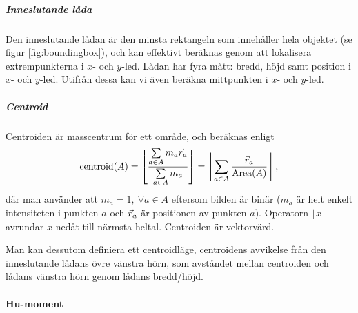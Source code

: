 \documentclass[../rapport_MVEX01-11-05]{subfiles}
\begin{document}
\subparagraph{Inneslutande låda}

Den inneslutande lådan är den minsta rektangeln som innehåller hela
objektet (se figur \ref{fig:boundingbox}),
och kan effektivt beräknas genom att lokalisera
extrempunkterna i $x$- och $y$-led. Lådan har fyra mått: bredd, höjd samt
position i $x$- och $y$-led. Utifrån dessa kan vi även beräkna
mittpunkten i $x$- och $y$-led.

\subparagraph{Centroid}

Centroiden är masscentrum för ett område, och beräknas enligt
\begin{equation*}
  \textrm{centroid}(A) = \left\lfloor\frac{
    \sum\limits_{a\in A}m_a\vec{r}_a
  }{
    \sum\limits_{a\in A}m_a
  }\right\rfloor =
  \left\lfloor\sum\limits_{a\in
  A}\frac{\vec{r}_a}{\textrm{Area}(A)}\right\rfloor,
\end{equation*}
där man använder att $m_a=1,\:\forall a\in A$ eftersom bilden är
binär ($m_a$ är helt enkelt intensiteten i punkten $a$ och
$\vec{r}_a$ är positionen av punkten $a$). Operatorn $\lfloor
x\rfloor$ avrundar $x$ nedåt till närmsta heltal. Centroiden är vektorvärd.

Man kan dessutom definiera ett centroidläge, centroidens avvikelse från
den inneslutande lådans övre vänstra hörn, som avståndet mellan centroiden
och lådans vänstra hörn genom lådans bredd/höjd.

\paragraph{Hu-moment}
\end{document}
